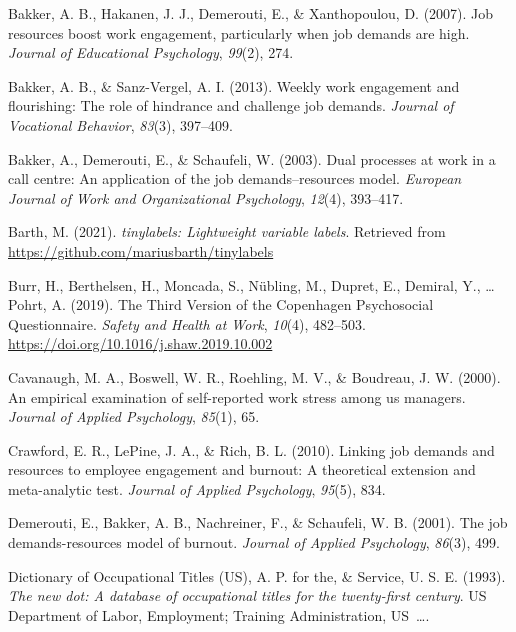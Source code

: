 \documentclass[
  english,
  man]{apa6}
\begin{document}
\leavevmode\hypertarget{ref-bakker2007job}{}%
Bakker, A. B., Hakanen, J. J., Demerouti, E., \& Xanthopoulou, D. (2007). Job resources boost work engagement, particularly when job demands are high. \emph{Journal of Educational Psychology}, \emph{99}(2), 274.

\leavevmode\hypertarget{ref-bakker2013weekly}{}%
Bakker, A. B., \& Sanz-Vergel, A. I. (2013). Weekly work engagement and flourishing: The role of hindrance and challenge job demands. \emph{Journal of Vocational Behavior}, \emph{83}(3), 397--409.

\leavevmode\hypertarget{ref-bakker2003dual}{}%
Bakker, A., Demerouti, E., \& Schaufeli, W. (2003). Dual processes at work in a call centre: An application of the job demands--resources model. \emph{European Journal of Work and Organizational Psychology}, \emph{12}(4), 393--417.

\leavevmode\hypertarget{ref-R-tinylabels}{}%
Barth, M. (2021). \emph{tinylabels: Lightweight variable labels}. Retrieved from \url{https://github.com/mariusbarth/tinylabels}

\leavevmode\hypertarget{ref-burr_third_2019}{}%
Burr, H., Berthelsen, H., Moncada, S., Nübling, M., Dupret, E., Demiral, Y., \ldots{} Pohrt, A. (2019). The Third Version of the Copenhagen Psychosocial Questionnaire. \emph{Safety and Health at Work}, \emph{10}(4), 482--503. \url{https://doi.org/10.1016/j.shaw.2019.10.002}

\leavevmode\hypertarget{ref-cavanaugh2000empirical}{}%
Cavanaugh, M. A., Boswell, W. R., Roehling, M. V., \& Boudreau, J. W. (2000). An empirical examination of self-reported work stress among us managers. \emph{Journal of Applied Psychology}, \emph{85}(1), 65.

\leavevmode\hypertarget{ref-crawford2010linking}{}%
Crawford, E. R., LePine, J. A., \& Rich, B. L. (2010). Linking job demands and resources to employee engagement and burnout: A theoretical extension and meta-analytic test. \emph{Journal of Applied Psychology}, \emph{95}(5), 834.

\leavevmode\hypertarget{ref-demerouti2001job}{}%
Demerouti, E., Bakker, A. B., Nachreiner, F., \& Schaufeli, W. B. (2001). The job demands-resources model of burnout. \emph{Journal of Applied Psychology}, \emph{86}(3), 499.

\leavevmode\hypertarget{ref-advisory1993new}{}%
Dictionary of Occupational Titles (US), A. P. for the, \& Service, U. S. E. (1993). \emph{The new dot: A database of occupational titles for the twenty-first century}. US Department of Labor, Employment; Training Administration, US~\ldots.
\end{document}
